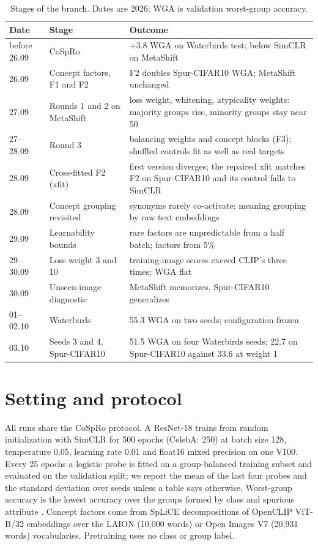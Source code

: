 \documentclass{article}
\begin{document}
\begin{table}[h]
\centering
\caption{Stages of the branch. Dates are 2026; WGA is validation worst-group accuracy.}
\label{tab:timeline}
\small
\begin{tabularx}{\linewidth}{l l X}
\toprule
Date & Stage & Outcome \\
\midrule
before 26.09 & CoSpRo & +3.8 WGA on Waterbirds test; below SimCLR on MetaShift \\
26.09 & Concept factors, F1 and F2 & F2 doubles Spur-CIFAR10 WGA; MetaShift unchanged \\
27.09 & Rounds 1 and 2 on MetaShift & loss weight, whitening, atypicality weights: majority groups rise, minority groups stay near 50 \\
27--28.09 & Round 3 & balancing weights and concept blocks (F3); shuffled controls fit as well as real targets \\
28.09 & Cross-fitted F2 (xfit) & first version diverges; the repaired xfit matches F2 on Spur-CIFAR10 and its control falls to SimCLR \\
28.09 & Concept grouping revisited & synonyms rarely co-activate; meaning grouping by raw text embeddings \\
29.09 & Learnability bounds & rare factors are unpredictable from a half batch; factors from 5\% \\
29--30.09 & Loss weight 3 and 10 & training-image scores exceed CLIP's three times; WGA flat \\
30.09 & Unseen-image diagnostic & MetaShift memorizes, Spur-CIFAR10 generalizes \\
01--02.10 & Waterbirds & 55.3 WGA on two seeds; configuration frozen \\
03.10 & Seeds 3 and 4, Spur-CIFAR10 & 51.5 WGA on four Waterbirds seeds; 22.7 on Spur-CIFAR10 against 33.6 at weight 1 \\
\bottomrule
\end{tabularx}
\end{table}

\section{Setting and protocol}
\label{sec:protocol}

All runs share the CoSpRo protocol. A ResNet-18 trains from random initialization with SimCLR
\citep{chen2020simclr} for 500 epochs (CelebA: 250) at batch size 128, temperature 0.05, learning rate
0.01 and float16 mixed precision on one V100. Every 25 epochs a logistic probe is fitted on a
group-balanced training subset and evaluated on the validation split; we report the mean of the last
four probes and the standard deviation over seeds unless a table says otherwise. Worst-group accuracy
is the lowest accuracy over the groups formed by class and spurious attribute \citep{sagawa2020groupdro}.
Concept factors come from SpLiCE \citep{bhalla2024splice} decompositions of OpenCLIP ViT-B/32
embeddings \citep{radford2021clip} over the LAION (10,000 words) or Open Images V7 (20,931 words)
vocabularies. Pretraining uses no class or group label.
\end{document}
